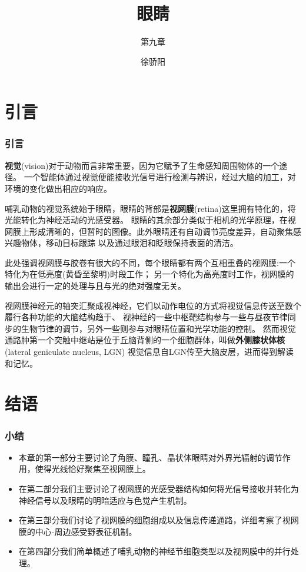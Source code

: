 \documentclass[UTF8]{ctexbeamer}
\title[眼睛] %
{眼睛}
\subtitle{第九章}
\author[]{徐骄阳} %
\institute[系统科学学院]{系统科学学院} %
\date[\today]{} %
\begin{document}
\frame{\titlepage}
\section*{引言}
\begin{frame}
    \frametitle{引言}

    \textbf{视觉}(vision)对于动物而言非常重要，因为它赋予了生命感知周围物体的一个途径。
    一个智能体通过视觉便能接收光信号进行检测与辨识，经过大脑的加工，对环境的变化做出相应的响应。

    哺乳动物的视觉系统始于眼睛，眼睛的背部是\textbf{视网膜}(retina)这里拥有特化的，将光能转化为神经活动的光感受器。
    眼睛的其余部分类似于相机的光学原理，在视网膜上形成清晰的，但暂时的图像。此外眼睛还有自动调节亮度差异，自动聚焦感兴趣物体，移动目标跟踪
    以及通过眼泪和眨眼保持表面的清洁。
    
    此处强调视网膜与胶卷有很大的不同，每个眼睛都有两个互相重叠的视网膜:一个特化为在低亮度(黄昏至黎明)时段工作；
    另一个特化为高亮度时工作，视网膜的输出会进行一定的处理与且与光的绝对强度无关。

    视网膜神经元的轴突汇聚成视神经，它们以动作电位的方式将视觉信息传送至数个履行各种功能的大脑结构趋于、
    视神经的一些中枢靶结构参与一些与昼夜节律同步的生物节律的调节，另外一些则参与对眼睛位置和光学功能的控制。
    然而视觉通路肿第一个突触中继站是位于丘脑背侧的一个细胞群体，叫做\textbf{外侧膝状体核}(lateral geniculate nucleus, LGN)
    视觉信息自LGN传至大脑皮层，进而得到解读和记忆。
\end{frame}








\section*{结语}
\begin{frame}
    \frametitle{小结}
    \begin{itemize}
        \item 本章的第一部分主要讨论了角膜、瞳孔、晶状体眼睛对外界光辐射的调节作用，使得光线恰好聚焦至视网膜上。
        \item 在第二部分我们主要讨论了视网膜的光感受器结构如何将光信号接收并转化为神经信号以及眼睛的明暗适应与色觉产生机制。
        \item 在第三部分我们讨论了视网膜的细胞组成以及信息传递通路，详细考察了视网膜的中心-周边感受野表征机制。
        \item 在第四部分我们简单概述了哺乳动物的神经节细胞类型以及视网膜中的并行处理。
    \end{itemize}
\end{frame}
\end{document}
